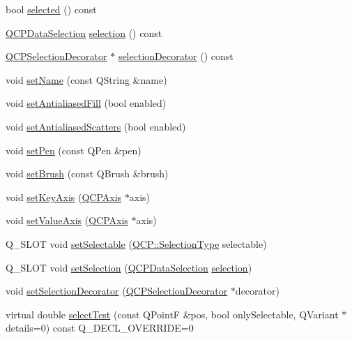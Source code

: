 \begin{DoxyCompactItemize}
bool \hyperlink{classQCPAbstractPlottable_a0b3b514474fe93354fc74cfc144184b4}{selected} () const
\item 
\hyperlink{classQCPDataSelection}{Q\+C\+P\+Data\+Selection} \hyperlink{classQCPAbstractPlottable_a040bf09f41d456284cfd39cc37aa068f}{selection} () const
\item 
\hyperlink{classQCPSelectionDecorator}{Q\+C\+P\+Selection\+Decorator} $\ast$ \hyperlink{classQCPAbstractPlottable_a7861518e47ca0c6a0c386032c2db075e}{selection\+Decorator} () const
\item 
void \hyperlink{classQCPAbstractPlottable_ab79c7ba76bc7fa89a4b3580e12149f1f}{set\+Name} (const Q\+String \&name)
\item 
void \hyperlink{classQCPAbstractPlottable_a089d6b5577120239b55c39ed27c39536}{set\+Antialiased\+Fill} (bool enabled)
\item 
void \hyperlink{classQCPAbstractPlottable_a2f03f067ede2ed4da6f7d0e4777a3f02}{set\+Antialiased\+Scatters} (bool enabled)
\item 
void \hyperlink{classQCPAbstractPlottable_ab74b09ae4c0e7e13142fe4b5bf46cac7}{set\+Pen} (const Q\+Pen \&pen)
\item 
void \hyperlink{classQCPAbstractPlottable_a7a4b92144dca6453a1f0f210e27edc74}{set\+Brush} (const Q\+Brush \&brush)
\item 
void \hyperlink{classQCPAbstractPlottable_a8524fa2994c63c0913ebd9bb2ffa3920}{set\+Key\+Axis} (\hyperlink{classQCPAxis}{Q\+C\+P\+Axis} $\ast$axis)
\item 
void \hyperlink{classQCPAbstractPlottable_a71626a07367e241ec62ad2c34baf21cb}{set\+Value\+Axis} (\hyperlink{classQCPAxis}{Q\+C\+P\+Axis} $\ast$axis)
\item 
Q\+\_\+\+S\+L\+OT void \hyperlink{classQCPAbstractPlottable_ac238d6e910f976f1f30d41c2bca44ac3}{set\+Selectable} (\hyperlink{namespaceQCP_ac6cb9db26a564b27feda362a438db038}{Q\+C\+P\+::\+Selection\+Type} selectable)
\item 
Q\+\_\+\+S\+L\+OT void \hyperlink{classQCPAbstractPlottable_a219bc5403a9d85d3129165ec3f5ae436}{set\+Selection} (\hyperlink{classQCPDataSelection}{Q\+C\+P\+Data\+Selection} \hyperlink{classQCPAbstractPlottable_a040bf09f41d456284cfd39cc37aa068f}{selection})
\item 
void \hyperlink{classQCPAbstractPlottable_a20e266ad646f8c4a7e4631040510e5d9}{set\+Selection\+Decorator} (\hyperlink{classQCPSelectionDecorator}{Q\+C\+P\+Selection\+Decorator} $\ast$decorator)
\item 
virtual double \hyperlink{classQCPAbstractPlottable_addb3f5c41f007a78c3e142cc605bc712}{select\+Test} (const Q\+PointF \&pos, bool only\+Selectable, Q\+Variant $\ast$details=0) const Q\+\_\+\+D\+E\+C\+L\+\_\+\+O\+V\+E\+R\+R\+I\+DE=0

\end{DoxyCompactItemize}
